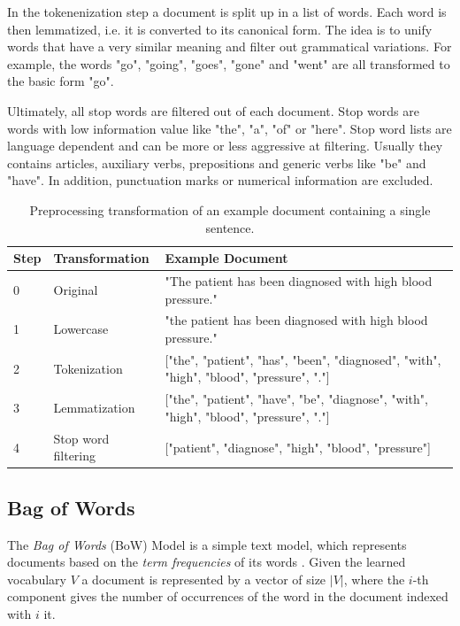 In the tokenenization step a document is split up in a list of words.
Each word is then lemmatized, i.e. it is converted to its canonical form.
The idea is to unify words that have a very similar meaning and filter out grammatical variations.
For example, the words  "go", "going", "goes", "gone" and "went" are all transformed to the basic form "go".

Ultimately, all stop words are filtered out of each document.
Stop words are words with low information value like "the", "a", "of" or "here".
Stop word lists are language dependent and can be more or less aggressive at filtering.
Usually they contains articles, auxiliary verbs, prepositions and generic verbs like "be" and "have".
In addition, punctuation marks or numerical information are excluded.

\begin{table}[!htbp]
	\begin{tabularx}{\textwidth}{l l p{9.8cm}}
		\toprule
		\textbf{Step} & \textbf{Transformation} & \textbf{Example Document}                                                       \\ \midrule
		0             & Original       & "The patient has been diagnosed with high blood pressure." \\
		1             & Lowercase               & "the patient has been diagnosed with high blood pressure." \\
		2 & Tokenization  & {[}"the", "patient", "has", "been", "diagnosed", "with", "high", "blood", "pressure", "."{]} \\
		3 & Lemmatization & {[}"the", "patient", "have", "be", "diagnose", "with", "high", "blood", "pressure", "."{]}   \\
		4             & Stop word filtering     & {[}"patient", "diagnose", "high", "blood", "pressure"{]} \\ \bottomrule
	\end{tabularx}
	\caption{Preprocessing transformation of an example document containing a single sentence.}
	\label{tab:text-preprocessing}
\end{table}


\subsection{Bag of Words}

The \textit{Bag of Words} (BoW) Model is a simple text model, which represents documents based on the \textit{term frequencies} of its words \cite{harris1954distributional}.
Given the learned vocabulary $V$ a document is represented by a vector of size $|V|$, where the $i$-th component gives the number of occurrences of the word in the document indexed with $i$ it.

